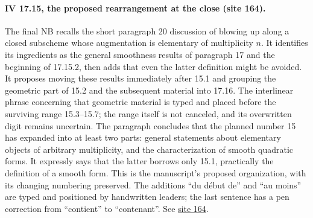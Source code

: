 \paragraph{IV 17.15, the proposed rearrangement at the close (site 164).}
The final NB recalls the short paragraph 20 discussion of blowing up along a closed subscheme whose augmentation is elementary of multiplicity $n$. It identifies its ingredients as the general smoothness results of paragraph 17 and the beginning of 17.15.2, then adds that even the latter definition might be avoided. It proposes moving these results immediately after 15.1 and grouping the geometric part of 15.2 and the subsequent material into 17.16. The interlinear phrase concerning that geometric material is typed and placed before the surviving range 15.3--15.7; the range itself is not canceled, and its overwritten digit remains uncertain. The paragraph concludes that the planned number 15 has expanded into at least two parts: general statements about elementary objects of arbitrary multiplicity, and the characterization of smooth quadratic forms. It expressly says that the latter borrows only 15.1, practically the definition of a smooth form. This is the manuscript's proposed organization, with its changing numbering preserved. The additions ``du début de'' and ``au moins'' are typed and positioned by handwritten leaders; the last sentence has a pen correction from ``contient'' to ``contenant''. See \href{https://grothendieck.umontpellier.fr/web/viewer.html?file=../25.pdf#page=165}{site 164}.
